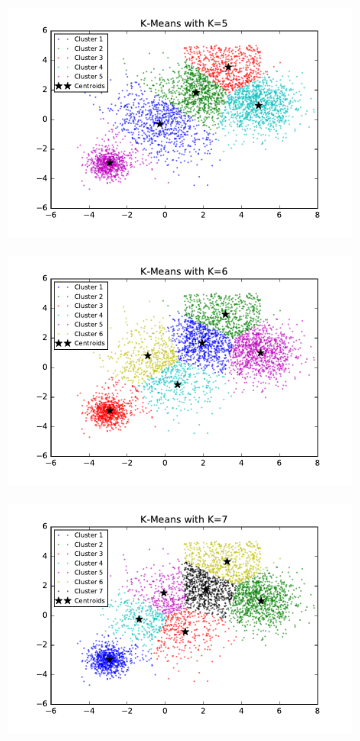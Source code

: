 \begin{description}
\begin{description}
\begin{figure}[!h]
\begin{subfigure}[b]{0.475\textwidth}
            \includegraphics[width=\textwidth]{./figures/bigClustering_kMeans_5.pdf}
        \end{subfigure}
        \hfill
        \begin{subfigure}[b]{0.475\textwidth}   
            \centering 
            \includegraphics[width=\textwidth]{./figures/bigClustering_kMeans_6.pdf}
        \end{subfigure}
        \begin{subfigure}[b]{0.475\textwidth}   
            \centering 
            \includegraphics[width=\textwidth]{./figures/bigClustering_kMeans_7.pdf}

\end{subfigure}
\end{figure}
\end{description}
\end{description}
